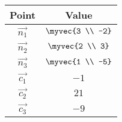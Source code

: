 \begin{tabular}[12pt]{ |c| c|}
    \hline
    \textbf{Point} & \textbf{Value}\\ 
    \hline
    $\vec{n_1}$ & $\myvec{3 \\ -2}$\\
    \hline
    $\vec{n_2}$ & $\myvec{2 \\ 3}$\\
    \hline
    $\vec{n_3}$ & $\myvec{1 \\ -5}$\\
    \hline
    $\vec{c_1}$ & $-1$\\
    \hline
    $\vec{c_2}$ & $21$\\
    \hline
    $\vec{c_3}$ & $-9$\\
    \hline
\end{tabular}